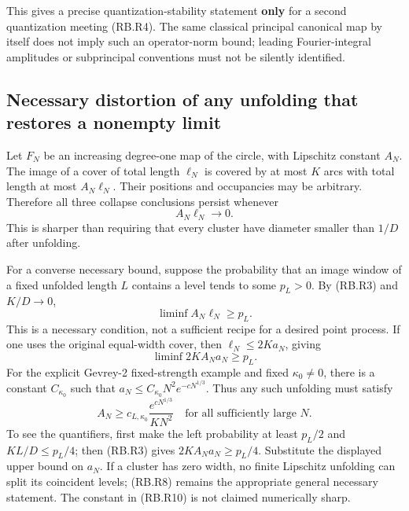 This gives a precise quantization-stability statement \textbf{only} for a second quantization meeting (RB.R4). The same classical principal canonical map by itself does not imply such an operator-norm bound; leading Fourier-integral amplitudes or subprincipal conventions must not be silently identified.

\subsection{Necessary distortion of any unfolding that restores a nonempty limit}\label{robustness:necessary-distortion-of-any-unfolding-that-restores-a-nonempty-limit}

Let \(F_N\) be an increasing degree-one map of the circle, with Lipschitz constant \(A_N\). The image of a cover of total length \(\ell_N\) is covered by at most \(K\) arcs with total length at most \(A_N\ell_N\). Their positions and occupancies may be arbitrary. Therefore all three collapse conclusions persist whenever \[
 A_N\ell_N\to0.                                            \tag{RB.R7}
\] This is sharper than requiring that every cluster have diameter smaller than \(1/D\) after unfolding.

For a converse necessary bound, suppose the probability that an image window of a fixed unfolded length \(L\) contains a level tends to some \(p_L>0\). By (RB.R3) and \(K/D\to0\), \[
 \liminf A_N\ell_N\geq p_L.                                \tag{RB.R8}
\] This is a necessary condition, not a sufficient recipe for a desired point process. If one uses the original equal-width cover, then \(\ell_N\leq2Ka_N\), giving \[
 \liminf 2KA_Na_N\geq p_L.                                 \tag{RB.R9}
\] For the explicit Gevrey-2 fixed-strength example and fixed \({\kappa_0}\ne0\), there is a constant \(C_{\kappa_0}\) such that \(a_N\leq C_{\kappa_0} N^2e^{-cN^{1/3}}\). Thus any such unfolding must satisfy \[
 A_N\geq c_{L,{\kappa_0}}\frac{e^{cN^{1/3}}}{KN^2}
 \quad\text{for all sufficiently large }N.                 \tag{RB.R10}
\] To see the quantifiers, first make the left probability at least \(p_L/2\) and \(KL/D\leq p_L/4\); then (RB.R3) gives \(2KA_Na_N\geq p_L/4\). Substitute the displayed upper bound on \(a_N\). If a cluster has zero width, no finite Lipschitz unfolding can split its coincident levels; (RB.R8) remains the appropriate general necessary statement. The constant in (RB.R10) is not claimed numerically sharp.
